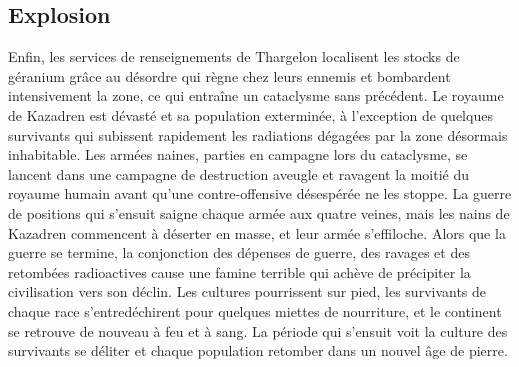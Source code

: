 \subsection{Explosion}
Enfin, les services de renseignements de Thargelon localisent les stocks de géranium grâce au désordre qui règne chez leurs ennemis et bombardent intensivement la zone, ce qui entraîne un cataclysme sans précédent. Le royaume de Kazadren est dévasté et sa population exterminée, à l'exception de quelques survivants qui subissent rapidement les radiations dégagées par la zone désormais inhabitable. Les armées naines, parties en campagne lors du cataclysme, se lancent dans une campagne de destruction aveugle et ravagent la moitié du royaume humain avant qu'une contre-offensive désespérée ne les stoppe. La guerre de positions qui s'ensuit saigne chaque armée aux quatre veines, mais les nains de Kazadren commencent à déserter en masse, et leur armée s'effiloche. 
\newline
Alors que la guerre se termine, la conjonction des dépenses de guerre, des ravages et des retombées radioactives cause une famine terrible qui achève de précipiter la civilisation vers son déclin. Les cultures pourrissent sur pied, les survivants de chaque race s'entredéchirent pour quelques miettes de nourriture, et le continent se retrouve de nouveau à feu et à sang. La période qui s'ensuit voit la culture des survivants se déliter et chaque population retomber dans un nouvel âge de pierre.